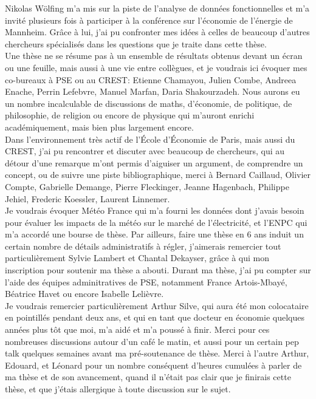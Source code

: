 Nikolas Wölfing m'a mis sur la piste de l'analyse de données fonctionnelles et m'a invité plusieurs fois à participer à la conférence sur l'économie de l'énergie de Mannheim. Grâce à lui, j'ai pu confronter mes idées à celles de beaucoup d'autres chercheurs spécialisés dans les questions que je traite dans cette thèse. \\

Une thèse ne se résume pas à un ensemble de résultats obtenus devant un écran ou une feuille, mais aussi à une vie entre collègues, et je voudrais ici évoquer mes co-bureaux à PSE ou au CREST: Etienne Chamayou, Julien Combe, Andreea Enache, Perrin Lefebvre, Manuel Marfan, Daria Shakourzadeh. Nous aurons eu un nombre incalculable de discussions de maths, d'économie, de politique, de philosophie, de religion ou encore de physique qui m'auront enrichi académiquement, mais bien plus largement encore. \\

Dans l'environnement très actif de l'École d'Économie de Paris, mais aussi du CREST, j'ai pu rencontrer et discuter avec beaucoup de chercheurs, qui au détour d'une remarque m'ont permis d'aiguiser un argument, de comprendre un concept, ou de suivre une piste bibliographique, merci à Bernard Caillaud, Olivier Compte, Gabrielle Demange, Pierre Fleckinger, Jeanne Hagenbach, Philippe Jehiel, Frederic Koessler, Laurent Linnemer.\\

Je voudrais évoquer Météo France qui m'a fourni les données dont j'avais besoin pour évaluer les impacts de la météo sur le marché de l'électricité, et l'ENPC qui m'a accordé une bourse de thèse. Par ailleurs, faire une thèse en 6 ans induit un certain nombre de détails administratifs à régler, j'aimerais remercier tout particulièrement Sylvie Lambert et Chantal Dekayser, grâce à qui mon inscription pour soutenir ma thèse a abouti. Durant ma thèse, j'ai pu compter sur l'aide des équipes adminitratives de PSE, notamment France Artois-Mbayé, Béatrice Havet ou encore Isabelle Lelièvre.\\

Je voudrais remercier particulièrement Arthur Silve, qui aura été mon colocataire en pointillés pendant deux ans, et qui en tant que docteur en économie quelques années plus tôt que moi, m'a aidé et m'a poussé à finir. Merci pour ces nombreuses discussions autour d'un café le matin, et aussi pour un certain pep talk quelques semaines avant ma pré-soutenance de thèse. Merci à l'autre Arthur, Edouard, et Léonard pour un nombre conséquent d'heures cumulées à parler de ma thèse et de son avancement, quand il n'était pas clair que je finirais cette thèse, et que j'étais allergique à toute discussion sur le sujet.\\


